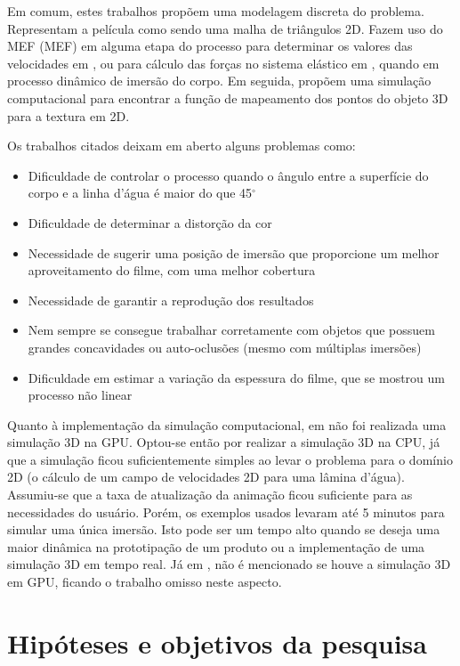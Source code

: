 Em comum, estes trabalhos propõem uma modelagem discreta do problema. Representam a película como sendo uma malha de triângulos 2D. Fazem uso do \acs{MEF} (\acl{MEF}) \cite{bathe2007finite} em alguma etapa do processo para determinar os valores das velocidades em \cite{zhang2015}, ou para cálculo das forças no sistema elástico em \cite{panozzo2015}, quando em processo dinâmico de imersão do corpo. Em seguida, propõem uma simulação computacional para encontrar a função de mapeamento dos pontos do objeto 3D para a textura em 2D.

Os trabalhos citados deixam em aberto alguns problemas como:
\begin{itemize}
\item Dificuldade de controlar o processo quando o ângulo entre a superfície do corpo e a linha d'água é maior do que 45$^{\circ}$
\item Dificuldade de determinar a distorção da cor
\item Necessidade de sugerir uma posição de imersão que proporcione um melhor aproveitamento do filme, com uma melhor cobertura
\item Necessidade de garantir a reprodução dos resultados
\item Nem sempre se consegue trabalhar corretamente com objetos que possuem grandes concavidades ou auto-oclusões (mesmo com múltiplas imersões)
\item Dificuldade em estimar a variação da espessura do filme, que se mostrou um processo não linear
\end{itemize}

Quanto à implementação da simulação computacional, em \cite{zhang2015} não foi realizada uma simulação 3D na GPU. Optou-se então por realizar a simulação 3D na CPU, já que a simulação ficou suficientemente simples ao levar o problema para o domínio 2D (o cálculo de um campo de velocidades 2D para uma lâmina d'água). Assumiu-se que a taxa de atualização da animação ficou suficiente para as necessidades do usuário. Porém, os exemplos usados levaram até 5 minutos para simular uma única imersão. Isto pode ser um tempo alto quando se deseja uma maior dinâmica na prototipação de um produto ou a implementação de uma simulação 3D em tempo real. Já em \cite{panozzo2015}, não é mencionado se houve a simulação 3D em GPU, ficando o trabalho omisso neste aspecto.

\section{Hipóteses e objetivos da pesquisa}

